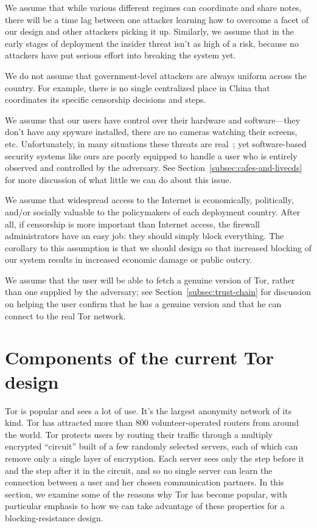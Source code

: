 \documentclass{llncs}
\begin{document}
We assume that while various different regimes can coordinate and share
notes, there will be a time lag between one attacker learning
how to overcome a facet of our design and other attackers picking it up.
Similarly, we assume that in the early stages of deployment the insider
threat isn't as high of a risk, because no attackers have put serious
effort into breaking the system yet.

We do not assume that government-level attackers are always uniform across
the country. For example, there is no single centralized place in China
that coordinates its specific censorship decisions and steps.

We assume that our users have control over their hardware and
software---they don't have any spyware installed, there are no
cameras watching their screens, etc. Unfortunately, in many situations
these threats are real~\cite{zuckerman-threatmodels}; yet
software-based security systems like ours are poorly equipped to handle
a user who is entirely observed and controlled by the adversary. See
Section~\ref{subsec:cafes-and-livecds} for more discussion of what little
we can do about this issue.

We assume that widespread access to the Internet is economically,
politically, and/or
socially valuable to the policymakers of each deployment country. After
all, if censorship
is more important than Internet access, the firewall administrators have
an easy job: they should simply block everything. The corollary to this
assumption is that we should design so that increased blocking of our
system results in increased economic damage or public outcry.

We assume that the user will be able to fetch a genuine
version of Tor, rather than one supplied by the adversary; see
Section~\ref{subsec:trust-chain} for discussion on helping the user
confirm that he has a genuine version and that he can connect to the
real Tor network.

\section{Components of the current Tor design}
\label{sec:current-tor}

Tor is popular and sees a lot of use. It's the largest anonymity
network of its kind.
Tor has attracted more than 800 volunteer-operated routers from around the
world.  Tor protects users by routing their traffic through a multiply
encrypted ``circuit'' built of a few randomly selected servers, each of which
can remove only a single layer of encryption.  Each server sees only the step
before it and the step after it in the circuit, and so no single server can
learn the connection between a user and her chosen communication partners.
In this section, we examine some of the reasons why Tor has become popular,
with particular emphasis to how we can take advantage of these properties
for a blocking-resistance design.
\end{document}
